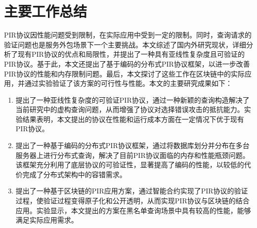 \section{主要工作总结}
PIR协议因性能问题受到限制，在实际应用中受到一定的限制。同时，查询请求的验证问题也是服务外包场景下一个主要挑战。本文综述了国内外研究现状，详细分析了现有PIR协议的优点和局限性，并提出了一种具有亚线性复杂度且可验证的PIR协议。基于此，本文还提出了基于编码的分布式PIR协议框架，以进一步改善PIR协议的性能和内存限制问题。最后，本文探讨了这些工作在区块链中的实际应用，并通过实验验证了该方案的可行性与性能。本文的主要研究成果如下：
\begin{enumerate}
    \item 提出了一种亚线性复杂度的可验证PIR协议，通过一种新颖的查询构造解决了当前研究中的虚构查询问题，从而增强了协议对选择错误攻击的抵抗能力。实验结果表明，本文提出的协议在性能和运行成本方面在一定情况下优于现有PIR协议。
    \item 提出了一种基于编码的分布式PIR协议框架，通过将数据库划分并分布在多台服务器上进行分布式查询，解决了目前PIR协议面临的内存和性能瓶颈问题。该框架充分利用了底层协议的可验证性，显著提高了编码的性能，以较低的代价完成了分布式架构中的容错需求。
    \item 提出了一种基于区块链的PIR应用方案，通过智能合约实现了PIR协议的验证过程，使验证过程变得原子化和公开透明，从而实现PIR协议与区块链的结合应用。实验显示，本文提出的方案在黑名单查询场景中具有较高的性能，能够满足实际应用需求。
\end{enumerate}